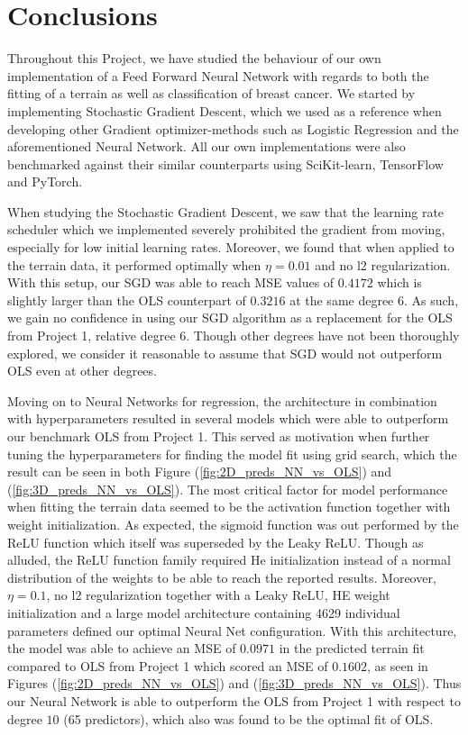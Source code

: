 \documentclass
[twocolumn,
secnumarabic,
nobibnotes,
aps,
prl,
reprint,
groupedaddress,
amsmath,
amssymb
]{revtex4-2}
\begin{document}
\section{Conclusions}
Throughout this Project, we have studied the behaviour of our own implementation of a Feed Forward Neural Network with regards to both the fitting of a terrain as well as classification of breast cancer. We started by implementing Stochastic Gradient Descent, which we used as a reference when developing other Gradient optimizer-methods such as Logistic Regression and the aforementioned Neural Network. All our own implementations were also benchmarked against their similar counterparts using SciKit-learn, TensorFlow and PyTorch. 

When studying the Stochastic Gradient Descent, we saw that the learning rate scheduler which we implemented severely prohibited the gradient from moving, especially for low initial learning rates. Moreover, we found that when applied to the terrain data, it performed optimally when $\eta = 0.01$ and no l2 regularization. With this setup, our SGD was able to reach MSE values of $0.4172$ which is slightly larger than the OLS counterpart of $0.3216$ at the same degree 6. As such, we gain no confidence in using our SGD algorithm as a replacement for the OLS from Project 1, relative degree 6. Though other degrees have not been thoroughly explored, we consider it reasonable to assume that SGD would not outperform OLS even at other degrees.

Moving on to Neural Networks for regression, the architecture in combination with hyperparameters resulted in several models which were able to outperform our benchmark OLS from Project 1. This served as motivation when further tuning the hyperparameters for finding the model fit using grid search, which the result can be seen in both Figure (\ref{fig:2D_preds_NN_vs_OLS}) and (\ref{fig:3D_preds_NN_vs_OLS}). The most critical factor for model performance when fitting the terrain data seemed to be the activation function together with weight initialization. As expected, the sigmoid function was out performed by the ReLU function which itself was superseded by the Leaky ReLU. Though as alluded, the ReLU function family required He initialization instead of a normal distribution of the weights to be able to reach the reported results. Moreover, $\eta = 0.1$, no l2 regularization together with a Leaky ReLU, HE weight initialization and a large model architecture containing 4629 individual parameters defined our optimal Neural Net configuration. With this architecture, the model was able to achieve an MSE of $0.0971$ in the predicted terrain fit compared to OLS from Project 1 which scored an MSE of $0.1602$, as seen in Figures (\ref{fig:2D_preds_NN_vs_OLS}) and (\ref{fig:3D_preds_NN_vs_OLS}). Thus our Neural Network is able to outperform the OLS from Project 1 with respect to degree $10$ (65 predictors), which also was found to be the optimal fit of OLS. 
\end{document}
